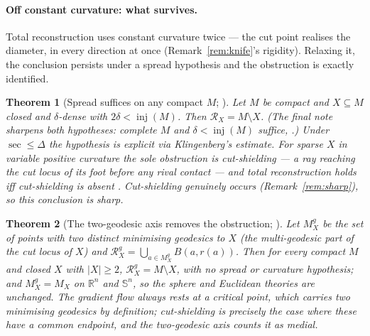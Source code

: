 \documentclass[11pt]{article}
\newtheorem{theorem}{Theorem}[section]
\theoremstyle{remark}
\newcommand{\R}{\mathbb{R}}
\newcommand{\X}{X}
\newcommand{\Mx}{M_{\X}}
\newcommand{\Rx}{\mathcal{R}_{\X}}
\newcommand{\inj}{\operatorname{inj}}
\newcommand{\sect}{\operatorname{sec}}
\newcommand{\Sn}{\mathbb{S}^{n}}
\begin{document}
\paragraph{Off constant curvature: what survives.} Total reconstruction
uses constant curvature twice --- the cut point realises the diameter, in
every direction at once (Remark~\ref{rem:knife}'s rigidity). Relaxing it,
the conclusion persists under a spread hypothesis and the obstruction is
exactly identified.

\begin{theorem}[Spread suffices on any compact $M$;
{\cite[Thm.~6.1]{Sph}}]\label{thm:spread}
Let $M$ be compact and $\X\subseteq M$ closed and $\delta$-dense with
$2\delta<\inj(M)$. Then $\Rx=M\setminus\X$. (The final note sharpens
both hypotheses: complete $M$ and $\delta<\inj(M)$ suffice,
\cite[Cor.~3.3]{C}.) Under $\sect\le\Delta$ the
hypothesis is explicit via Klingenberg's estimate. For sparse $\X$ in
variable positive curvature the sole obstruction is \emph{cut-shielding}
--- a ray reaching the cut locus of its foot before any rival contact ---
and total reconstruction holds iff cut-shielding is absent
\cite[Prop.~7.1]{Sph}. Cut-shielding genuinely occurs
(Remark~\ref{rem:sharp}), so this conclusion is sharp.
\end{theorem}

\begin{theorem}[The two-geodesic axis removes the obstruction;
{\cite[Thm.~8.3]{Sph}}]\label{thm:twogeo}
Let $\Mx^{g}$ be the set of points with two distinct minimising geodesics
to $\X$ \textup{(}the multi-geodesic part of the cut locus of
$\X$\textup{)} and $\Rx^{g}=\bigcup_{a
\in\Mx^{g}}B(a,r(a))$. Then for \emph{every} compact $M$ and closed $\X$
with $|\X|\ge2$, $\Rx^{g}=M\setminus\X$, with no spread or curvature
hypothesis; and $\Mx^{g}=\Mx$ on $\R^{n}$ and $\Sn$, so the sphere and
Euclidean theories are unchanged. The gradient flow always rests at a
critical point, which carries two minimising geodesics by definition;
cut-shielding is precisely the case where these have a common endpoint, and
the two-geodesic axis counts it as medial.
\end{theorem}
\end{document}
